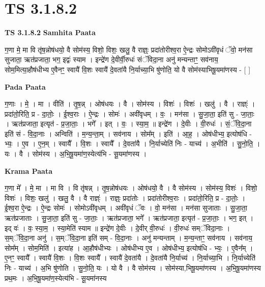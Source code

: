 \documentclass[17pt]{extarticle}
\begin{document}
\section{ TS 3.1.8.2 }

\textbf{TS 3.1.8.2 } \newline
\textbf{Samhita Paata} \newline

ग॒णा मे॒ मा वि तृ॑ष॒न्नोष॑धयो॒ वै सोम॑स्य॒ विशो॒ विशः॒ खलु॒ वै राज्ञ्ः॒ प्रदा॑तोरीश्व॒रा ऐ॒न्द्रः सोमोऽवी॑वृधं ॅवो॒ मन॑सा सुजाता॒ ऋत॑प्रजाता॒ भग॒ इद्वः॑ स्याम । इन्द्रे॑ण दे॒वीर्वी॒रुधः॑ संॅविदा॒ना अनु॑ मन्यन्ताꣳ॒॒ सव॑नाय॒ सोम॒मित्या॒हौष॑धीभ्य ए॒वैनꣳ॒॒ स्वायै॑ वि॒शः स्वायै॑ दे॒वता॑यै नि॒र्याच्या॒भि षु॑णोति॒ यो वै सोम॑स्याभिषू॒यमा॑णस्य - [  ] \newline

\textbf{Pada Paata} \newline

ग॒णाः । मे॒ । मा । वीति॑ । तृ॒ष॒न्न् । ओष॑धयः । वै । सोम॑स्य । विशः॑ । विशः॑ । खलु॑ । वै । राज्ञ्ः॑ । प्रदा॑तो॒रिति॒ प्र - दा॒तोः॒ । ई॒श्व॒राः । ऐ॒न्द्रः । सोमः॑ । अवी॑वृधम् । वः॒ । मन॑सा । सु॒जा॒ता॒ इति॑ सु - जा॒ताः॒ । ऋत॑प्रजाता॒ इत्यृत॑ - प्र॒जा॒ताः॒ । भगे᳚ । इत् । वः॒ । स्या॒म॒ ॥ इन्द्रे॑ण । दे॒वीः । वी॒रुधः॑ । सं॒ॅवि॒दा॒ना इति॑ सं - वि॒दा॒नाः । अन्विति॑ । म॒न्य॒न्ता॒म् । सव॑नाय । सोम᳚म् । इति॑ । आ॒ह॒ । ओष॑धीभ्य॒ इत्योष॑धि - भ्यः॒ । ए॒व । ए॒न॒म् । स्वायै᳚ । वि॒शः । स्वायै᳚ । दे॒वता॑यै । नि॒र्याच्येति॑ निः - याच्य॑ । अ॒भीति॑ । सु॒नो॒ति॒ । यः । वै । सोम॑स्य । अ॒भि॒षू॒यमा॑ण॒स्येत्य॑भि - सू॒यमा॑णस्य ।  \newline


\textbf{Krama Paata} \newline

ग॒णा मे᳚ । मे॒ मा । मा वि । वि तृ॑षन्न् । तृ॒ष॒न्नोष॑धयः । ओष॑धयो॒ वै । वै सोम॑स्य । सोम॑स्य॒ विशः॑ । विशो॒ विशः॑ । विशः॒ खलु॑ । खलु॒ वै । वै राज्ञ्ः॑ । राज्ञ्ः॒ प्रदा॑तोः । प्रदा॑तोरीश्व॒राः । प्रदा॑तो॒रिति॒ प्र - दा॒तोः॒ । ई॒श्व॒रा ऐ॒न्द्रः । ऐ॒न्द्रः सोमः॑ । सोमोऽवी॑वृधम् । अवी॑वृधं ॅवः । वो॒ मन॑सा । मन॑सा सुजाताः । सु॒जा॒ता॒ ऋत॑प्रजाताः । सु॒जा॒ता॒ इति॑ सु - जा॒ताः॒ । ऋत॑प्रजाता॒ भगे᳚ । ऋत॑प्रजाता॒ इत्यृत॑ - प्र॒जा॒ताः॒ । भग॒ इत् । इद् वः॑ । वः॒ स्या॒म॒ । स्या॒मेति॑ स्याम ॥ इन्द्रे॑ण दे॒वीः । दे॒वीर् वी॒रुधः॑ । वी॒रुधः॑ सम्ॅविदा॒नाः । स॒म्ॅवि॒दा॒ना अनु॑ । स॒म्ॅवि॒दा॒ना इति॑ सम् - वि॒दा॒नाः । अनु॑ मन्यन्ताम् । म॒न्य॒न्ताꣳ॒॒ सव॑नाय । सव॑नाय॒ सोम᳚म् । सोम॒मिति॑ । इत्या॑ह । आ॒हौष॑धीभ्यः । ओष॑धीभ्य ए॒व । ओष॑धीभ्य॒ इत्योष॑धि - भ्यः॒ । ए॒वैन᳚म् । ए॒नꣳ॒॒ स्वायै᳚ । स्वायै॑ वि॒शः । वि॒शः स्वायै᳚ । स्वायै॑ दे॒वता॑यै । दे॒वता॑यै नि॒र्याच्य॑ । नि॒र्याच्या॒भि । नि॒र्याच्येति॑ निः - याच्य॑ । अ॒भि षु॑णोति । सु॒नो॒ति॒ यः । यो वै । वै सोम॑स्य । सोम॑स्या,भिषू॒यमा॑णस्य । अ॒भि॒षू॒यमा॑णस्य प्रथ॒मः । अ॒भि॒षू॒यमा॑ण॒स्येत्य॑भि - सू॒यमा॑नस्य \newline
\end{document}

